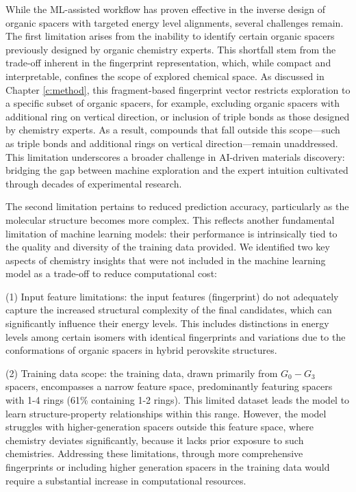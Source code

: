 While the ML-assisted workflow has proven effective in the inverse design of organic spacers with targeted energy level alignments, several challenges remain. The first limitation arises from the inability to identify certain organic spacers previously designed by organic chemistry experts. This shortfall stem from the trade-off inherent in the fingerprint representation, which, while compact and interpretable, confines the scope of explored chemical space. As discussed in Chapter \ref{c:method}, this fragment-based fingerprint vector restricts exploration to a specific subset of organic spacers, for example, excluding organic spacers with additional ring on vertical direction, or inclusion of triple bonds as those designed by chemistry experts. As a result, compounds that fall outside this scope—such as triple bonds and additional rings on vertical direction—remain unaddressed\cite{RN606,RN20}. This limitation underscores a broader challenge in AI-driven materials discovery: bridging the gap between machine exploration and the expert intuition cultivated through decades of experimental research.

The second limitation pertains to reduced prediction accuracy, particularly as the molecular structure becomes more complex. This reflects another fundamental limitation of machine learning models: their performance is intrinsically tied to the quality and diversity of the training data provided. We identified two key aspects of chemistry insights that were not included in the machine learning model as a trade-off to reduce computational cost: 

(1) Input feature limitations: the input features (fingerprint) do not adequately capture the increased structural complexity of the final candidates, which can significantly influence their energy levels. This includes distinctions in energy levels among certain isomers with identical fingerprints and variations due to the conformations of organic spacers in hybrid perovskite structures. 

(2) Training data scope: the training data, drawn primarily from $G_0-G_3$ spacers, encompasses a narrow feature space, predominantly featuring spacers with 1-4 rings (61\% containing 1-2 rings). This limited dataset leads the model to learn structure-property relationships within this range. However, the model struggles with higher-generation spacers outside this feature space, where chemistry deviates significantly, because it lacks prior exposure to such chemistries. Addressing these limitations, through more comprehensive fingerprints or including higher generation spacers in the training data would require a substantial increase in computational resources. 


